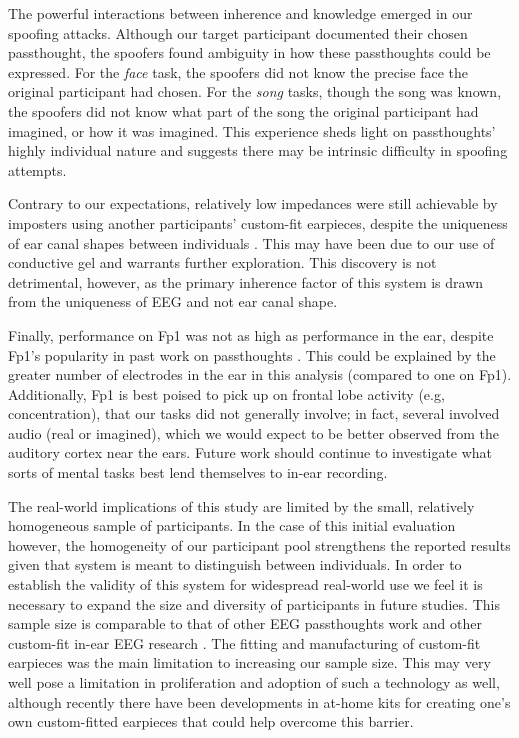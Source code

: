 \documentclass{sigchi}
\begin{document}
The powerful interactions between inherence and knowledge emerged in our spoofing attacks. Although our target participant documented their chosen passthought, the spoofers found ambiguity in how these passthoughts could be expressed. For the \textit{face} task, the spoofers did not know the precise face the original participant had chosen. For the \textit{song} tasks, though the song was known, the spoofers did not know what part of the song the original participant had imagined, or how it was imagined. This experience sheds light on passthoughts' highly individual nature and suggests there may be intrinsic difficulty in spoofing attempts.

Contrary to our expectations, relatively low impedances were still achievable by imposters using another participants' custom-fit earpieces, despite the uniqueness of ear canal shapes between individuals \cite{Akkermans2005}. This may have been due to our use of conductive gel and warrants further exploration. This discovery is not detrimental, however, as the primary inherence factor of this system is drawn from the uniqueness of EEG and not ear canal shape.

Finally, performance on Fp1 was not as high as performance in the ear, despite Fp1's popularity in past work on passthoughts \cite{Chuang2013b}. This could be explained by the greater number of electrodes in the ear in this analysis (compared to one on Fp1). Additionally, Fp1 is best poised to pick up on frontal lobe activity (e.g, concentration), that our tasks did not generally involve; in fact, several involved audio (real or imagined), which we would expect to be better observed from the auditory cortex near the ears. Future work should continue to investigate what sorts of mental tasks best lend themselves to in-ear recording.

The real-world implications of this study are limited by the small, relatively homogeneous sample of participants. In the case of this initial evaluation however, the homogeneity of our participant pool strengthens the reported results given that system is meant to distinguish between individuals. In order to establish the validity of this system for widespread real-world use we feel it is necessary to expand the size and diversity of participants in future studies. This sample size is comparable to that of other EEG passthoughts work \cite{Ashby2011, Marcel2007a, Poulos2002, Chuang2013b, curran2016passthoughts} and other custom-fit in-ear EEG research \cite{Kidmose2013a, Mikkelsen2015}. The fitting and manufacturing of custom-fit earpieces was the main limitation to increasing our sample size. This may very well pose a limitation in proliferation and adoption of such a technology as well, although recently there have been developments in at-home kits for creating one's own custom-fitted earpieces \cite{voix2015settable} that could help overcome this barrier.
\end{document}
